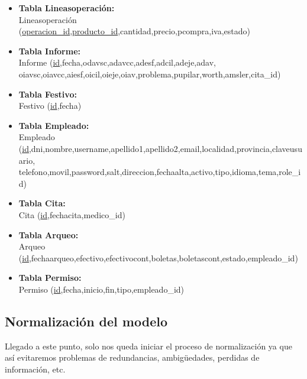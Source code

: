 \begin{itemize}
\item \textbf{Tabla Lineasoperación:}\\
Lineasoperación (\underline{operacion\_id},\underline{producto\_id},cantidad,precio,pcompra,iva,estado)
\item \textbf{Tabla Informe:}\\
Informe (\underline{id},fecha,odavsc,adavcc,adesf,adcil,adeje,adav,\\oiavsc,oiavcc,aiesf,oicil,oieje,oiav,problema,pupilar,worth,amsler,cita\_id)
\item \textbf{Tabla Festivo:}\\
Festivo (\underline{id},fecha)
\item \textbf{Tabla Empleado:}\\
Empleado (\underline{id},dni,nombre,username,apellido1,apellido2,email,localidad,provincia,claveusuario,\\telefono,movil,password,salt,direccion,fechaalta,activo,tipo,idioma,tema,role\_id)
\item \textbf{Tabla Cita:}\\
Cita (\underline{id},fechacita,medico\_id)
\item \textbf{Tabla Arqueo:}\\
Arqueo (\underline{id},fechaarqueo,efectivo,efectivocont,boletas,boletascont,estado,empleado\_id)
\item \textbf{Tabla Permiso:}\\
Permiso (\underline{id},fecha,inicio,fin,tipo,empleado\_id)
\end{itemize}
\newpage
\subsection{Normalización del modelo}
Llegado a este punto, solo nos queda iniciar el proceso de normalización ya que así evitaremos problemas de redundancias, ambigüedades, perdidas de información, etc.

